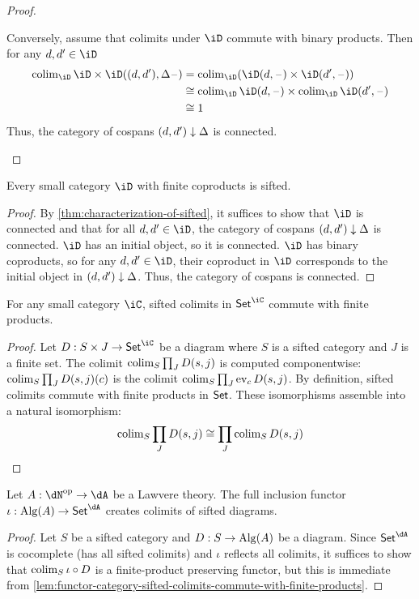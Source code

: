 \documentclass{zett}
\begin{document}
\begin{proof}
\begin{node}
    Conversely, assume that colimits under $\iD$ commute with binary products.
    Then for any $d, d' \in \iD$
    \begin{align}
      \colim_{\iD}\iD \times \iD((d, d'), \Delta\blank) &= \colim_{\iD}(\iD(d, \blank) \times \iD(d', \blank))\\
                                              &\iso \colim_{\iD}\iD(d, \blank) \times \colim_{\iD}\iD(d', \blank)\\
                                              &\iso 1
    \end{align}
    Thus, the category of cospans $(d, d') \downarrow \Delta$ is connected.
  \end{node}
\end{proof}

\begin{cor}\label{cor:finite-coproducts-then-sifted}
  Every small category $\iD$ with finite coproducts is sifted.
\end{cor}
\begin{proof}
  By \cref{thm:characterization-of-sifted}, it suffices to show that $\iD$ is connected and that for all $d, d' \in \iD$, the category of cospans $(d, d') \downarrow \Delta$ is connected.
  $\iD$ has an initial object, so it is connected.
  $\iD$ has binary coproducts, so for any $d, d' \in \iD$, their coproduct in $\iD$ corresponds to the initial object in $(d, d') \downarrow \Delta$.
  Thus, the category of cospans is connected.
\end{proof}

\begin{lem}\label{lem:functor-category-sifted-colimits-commute-with-finite-products}
  For any small category $\iC$, sifted colimits in $\CSet^{\iC}$ commute with finite products.
\end{lem}
\begin{proof}
  Let $D : S \times J \to \CSet^{\iC}$ be a diagram where $S$ is a sifted category and $J$ is a finite set.
  The colimit $\operatorname{colim}_{S}\prod_{J}D(s,j)$ is computed componentwise: $\operatorname{colim}_{S}\prod_{J}D(s,j)(c)$ is the colimit $\operatorname{colim}_{S}\prod_{J}\operatorname{ev}_{c}D(s,j)$.
  By definition, sifted colimits commute with finite products in $\mathsf{Set}$.
  These isomorphisms assemble into a natural isomorphism:
  \[
    \operatorname{colim}_{S}\prod_{J}D(s,j) \cong \prod_{J}\operatorname{colim}_{S}D(s,j)
  \]
\end{proof}

\begin{lem}
  Let $A : \dN\op \to \dA$ be a Lawvere theory.
  The full inclusion functor $\iota : \Alg(A) \to \CSet^{\dA}$ creates colimits of sifted diagrams.
\end{lem}
\begin{proof}
  Let $S$ be a sifted category and $D : S \to \operatorname{Alg}(A)$ be a diagram.
  Since $\CSet^{\dA}$ is cocomplete (has all sifted colimits) and $\iota$ reflects all colimits, it suffices to show that $\operatorname{colim}_{S}\iota \circ D$ is a finite-product preserving functor, but this is immediate from \cref{lem:functor-category-sifted-colimits-commute-with-finite-products}.
\end{proof}
\end{document}
